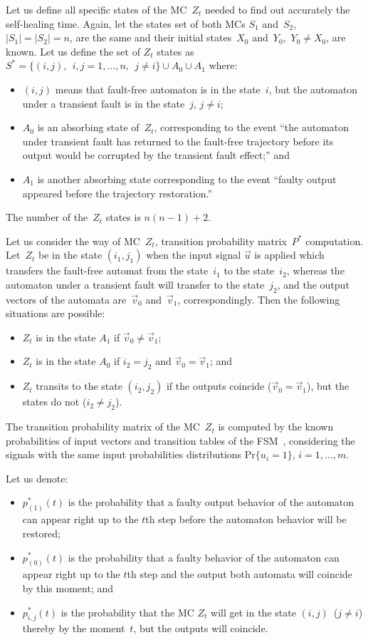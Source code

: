 \begin{multicols}{2}
Let us define all specific states of the MC~$Z_t$ needed
to find out accurately the  self-healing time. Again, let  the
states set of both MCs $S_1$ and~$S_2$,\  $|S_1|=|S_2|= n$, are the
same and their initial states~$X_0 $ and~$Y_0$,\  $Y_0 \ne X_0$,
are known. Let us define the set of $Z_t$ states as $S^* =
\{(i,j),\ \ i,j = 1,\ldots,n,\ \ j \ne i\} \cup A_0\cup A_1$
where:
\begin{itemize}
\item
$(i,j)$ means that fault-free automaton is in the state~$i$,
but the automaton under a transient fault is in the state~$j$,
$j\ne i$;
\item
$A_0$ is an absorbing state of~$Z_t$, corresponding
to the event ``the automaton under transient fault has returned
to the fault-free trajectory before its output would be corrupted
by the transient fault effect;'' and
\item
$A_1$ is another absorbing state corresponding to the event
``faulty output appeared  before the trajectory restoration.''
\end{itemize}

The number of the~$Z_t$ states is $n(n-1)+2$.

Let us consider the way of MC~$Z_t$, transition
probability matrix~$P^*$ computation.
Let~$Z_t$  be in the state $(i_1,j_1)$ when the input signal
$\vec u$ is applied which transfers the fault-free automat
from the state~$i_1$ to the state~$i_2$, whereas the
automaton under a transient fault
will transfer to the state~$j_2$, and the output vectors
of the automata are~$\vec v_0$ and~$\vec v_1$, correspondingly.
Then the following situations are possible:
\begin{itemize}
\item $Z_t$ is in the state $A_1$ if $\vec v_0 \ne \vec v_1$;
\item
$Z_t$ is in the state $A_0$ if $i_2=j_2$ and $\vec v_0 =\vec v_1$; and
\item
$Z_t$ transits to the state $(i_2,j_2)$ if the outputs
coincide ($\vec v_0=\vec v_1$), but the states do not ($i_2\ne j_2$).
\end{itemize}

The transition probability matrix of the MC~$Z_t$ is computed by the known probabilities of input
vectors and transition tables of the FSM~\cite{7fr}, considering
the signals with the same input probabilities
distributions $\mathrm{Pr}\{u_i=1\}$, $i=1,\ldots,m$.

Let us denote:
\begin{itemize}
\item $p^*_{(1)}(t)$ is the probability that a faulty output behavior
of the automaton can appear right up to the $t$th step before the
automaton behavior will be restored;
\item
$p^*_{(0)}(t)$ is the probability that a faulty behavior of the
automaton can appear right up to the $t$th step and the output
both automata will coincide by this moment; and
\item
$p^*_{i,j}(t)$ is the probability that the MC $Z_t$ will get
in the state $(i,j)$\  ($j \ne i$) thereby by the moment~$t$, but the outputs will coincide.
\end{itemize}


\end{multicols}
